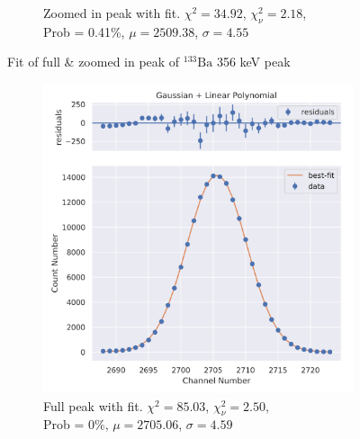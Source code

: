 \documentclass[11pt,a4paper]{article}
\newcommand{\element}[2]{$^{#2}\textrm{#1}$}
\begin{document}
\begin{figure}[H]
\begin{subfigure}{.5\linewidth}
    \caption{Zoomed in peak with fit. $\chi^2 = 34.92$, $\chi^2_\nu = 2.18$, \\ Prob = 0.41\%, $\mu = 2509.38$, $\sigma = 4.55$}
  \end{subfigure}
  \caption{Fit of full \& zoomed in peak of \element{Ba}{133} 356 keV peak}
\end{figure}
\begin{figure}[H]
  \centering
  \begin{subfigure}{.5\linewidth}
    \centering
    \includegraphics[width=\linewidth]{./Images/Barium133/Linear/Linear_7_Full.png}
    \caption{Full peak with fit. $\chi^2 = 85.03$, $\chi^2_\nu = 2.50$, \\ Prob = 0\%, $\mu = 2705.06$, $\sigma = 4.59$}
  \end{subfigure}%
  \begin{subfigure}{.5\linewidth}
    \centering

\end{subfigure}
\end{figure}
\end{document}
